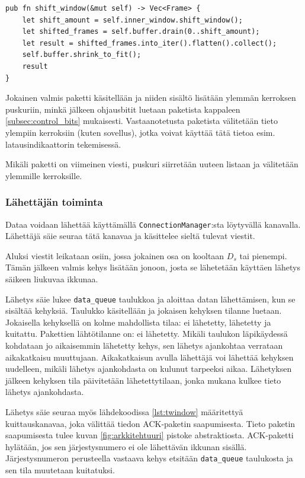 \documentclass[a4paper,12pt]{article}
\begin{document}
    \begin{lstlisting}[caption={Datan purkaminen puskurista}, label={lst:shift_rwindow}]
pub fn shift_window(&mut self) -> Vec<Frame> {
    let shift_amount = self.inner_window.shift_window();
    let shifted_frames = self.buffer.drain(0..shift_amount);
    let result = shifted_frames.into_iter().flatten().collect();
    self.buffer.shrink_to_fit();
    result
}\end{lstlisting}

    Jokainen valmis paketti käsitellään ja niiden sisältö lisätään ylemmän kerroksen puskuriin, minkä jälkeen ohjausbitit luetaan paketista kappaleen \ref{subsec:control_bits} mukaisesti. Vastaanotetusta paketista välitetään tieto ylempiin kerroksiin (kuten sovellus), jotka voivat käyttää tätä tietoa esim. latausindikaattorin tekemisessä. \par

    Mikäli paketti on viimeinen viesti, puskuri siirretään uuteen listaan ja välitetään ylemmille kerroksille.

    \subsubsection*{Lähettäjän toiminta}\label{subsec:sender_impl}
    Dataa voidaan lähettää käyttämällä \lstinline{ConnectionManager}:sta löytyvällä kanavalla. Lähettäjä säie seuraa tätä kanavaa ja käsittelee sieltä tulevat viestit. \par

    Aluksi viestit leikataan osiin, jossa jokainen osa on kooltaan $D_s$ tai pienempi. Tämän jälkeen valmis kehys lisätään jonoon, josta se lähetetään käyttäen lähetys säikeen liukuvaa ikkunaa.
 
Lähetys säie lukee \lstinline{data_queue} taulukkoa ja aloittaa datan lähettämisen, kun se sisältää kehyksiä. Taulukko käsitellään ja jokaisen kehyksen tilanne luetaan. Jokaisella kehyksellä on kolme mahdollista tilaa: ei lähetetty, lähetetty ja kuitattu. Pakettien lähtötilanne on: ei lähetetty. Mikäli taulukon läpikäydessä kohdataan jo aikaisemmin lähetetty kehys, sen lähetys ajankohtaa verrataan aikakatkaisu muuttujaan. Aikakatkaisun avulla lähettäjä voi lähettää kehyksen uudelleen, mikäli lähetys ajankohdasta on kulunut tarpeeksi aikaa. Lähetyksen jälkeen kehyksen tila päivitetään lähetettytilaan, jonka mukana kulkee tieto lähetys ajankohdasta. \par

Lähetys säie seuraa myös lähdekoodissa \ref{lst:twindow} määritettyä kuittauskanavaa, joka välittää tiedon ACK-paketin saapumisesta. Tieto paketin saapumisesta tulee kuvan \ref{fig:arkkitehtuuri} pistoke abstraktiosta. ACK-paketti hylätään, jos sen järjestysnumero ei ole lähettävän ikkunan sisällä. Järjestysnumeron perusteella vastaava kehys etsitään \lstinline{data_queue} taulukosta ja sen tila muutetaan kuitatuksi. \par
    
\end{document}
